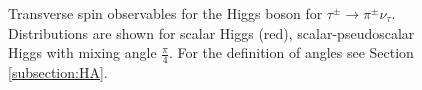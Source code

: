\documentclass[]{Tauola_interface_design}
\begin{document}
\begin{figure}[h!]
\centering
{}
\caption{Transverse spin observables for the Higgs boson for $\tau^{\pm}\rightarrow \pi^{\pm} \nu_{\tau}$.
Distributions are shown for scalar Higgs (red), scalar-pseudoscalar Higgs with mixing angle $\frac{\pi}{4}$. For the definition of angles see Section \ref{subsection:HA}.}
\end{figure}
\end{document}
